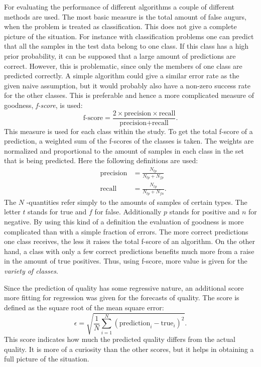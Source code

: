 \documentclass[twoside]{article}
\begin{document}
\begin{multicols}{2}
For evaluating the performance of different algorithms a couple of different methods are used. The 
most basic measure is the total amount of false augurs, when the problem is treated as classification.
This does not give a complete picture of the situation. For instance
with classification problems one can predict that all the samples in the test data belong to one class. If
this class has a high prior probability, it can be supposed that a large amount of predictions are correct.
However, this is problematic, since only the members of one class are predicted correctly. A simple algorithm
could give a similar error rate as the given naive assumption, but it would probably also have a non-zero success
rate for the other classes. This is preferable and hence a more complicated measure of goodness, \emph{f-score}, is used:
\begin{equation}
 \text{f-score} = \frac{ 2 \times \text{precision} \times \text{recall} }{\text{precision} + \text{recall}}.
\end{equation}
This measure is used for each class within the study. To get the total f-score of a prediction, a weighted sum of
the f-scores of the classes is taken. The weights are normalized and proportional to the amount of samples in
each class in the set that is being predicted. Here the following definitions are used:
\begin{eqnarray}
 &\text{precision} & = \frac{N_{tp}}{N_{tp}+N_{fp}} \\
 &\text{recall} & = \frac{N_{tp}}{N_{tp}+N_{fn}}.
\end{eqnarray}
The $N$ -quantities refer simply to the amounts of samples of certain types. The letter $t$ stands for true and $f$ for false.
Additionally $p$ stands for positive and $n$ for negative. By using this kind of a definition the evaluation of goodness
is more complicated than with a simple fraction of errors. The more correct predictions one class receives, the less it raises
the total f-score of an algorithm. On the other hand, a class with only a few correct predictions benefits much more from
a raise in the amount of true positives. Thus, using f-score, more value is given for the \emph{variety of classes}.

Since the prediction of quality has some regressive nature, an additional score more fitting for regression was given
for the forecasts of quality. The score is defined as the square root of the mean square error:
\begin{equation}\label{distmetric}
 \epsilon = \sqrt{\frac{1}{N} \sum_{i=1}^N ( \text{prediction}_i - \text{true}_i )^2 }.
\end{equation}
This score indicates how much the predicted quality differs from the actual quality. It is more of a curiosity than the other scores,
but it helps in obtaining a full picture of the situation.


\end{multicols}
\end{document}
